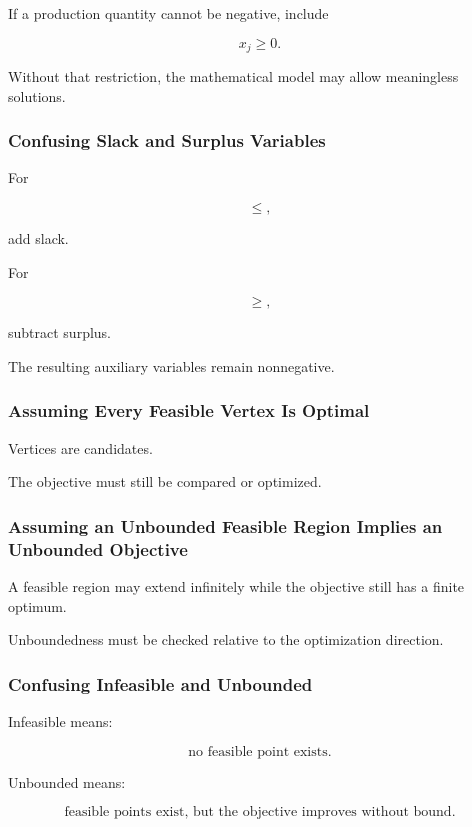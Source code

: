 If a production quantity cannot be negative, include

\[
\boxed{
x_j\geq0.
}
\]

Without that restriction, the mathematical model may allow meaningless
solutions.

\subsubsection{Confusing Slack and Surplus Variables}

For

\[
\leq,
\]

add slack.

For

\[
\geq,
\]

subtract surplus.

The resulting auxiliary variables remain nonnegative.

\subsubsection{Assuming Every Feasible Vertex Is Optimal}

Vertices are candidates.

The objective must still be compared or optimized.

\subsubsection{Assuming an Unbounded Feasible Region Implies an Unbounded Objective}

A feasible region may extend infinitely while the objective still has a
finite optimum.

Unboundedness must be checked relative to the optimization direction.

\subsubsection{Confusing Infeasible and Unbounded}

Infeasible means:

\[
\boxed{
\text{no feasible point exists}.
}
\]

Unbounded means:

\[
\boxed{
\text{feasible points exist, but the objective improves without bound}.
}
\]

